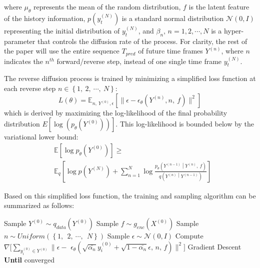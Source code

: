 \documentclass[lettersize,journal]{IEEEtran}
\begin{document}
where $\mu_\theta$ represents the mean of the random distribution, $f$ is the latent feature of the history information, $p\left(y_t^{\left(N\right)}\right)$ is a standard normal distribution $\mathcal{N}\left(0,I\right)$ representing the initial distribution of $y_t^{\left(N\right)}$, and $\beta_n,\, n=1,2,\cdots,N$ is a hyper-parameter that controls the diffusion rate of the process. For clarity, the rest of the paper will use the entire sequence $T_{pred}$ of future time frames $Y^{\left(n\right)}$, where $n$ indicates the $n^{th}$ forward/reverse step, instead of one single time frame $y_t^{\left(N\right)}$.

The reverse diffusion process is trained by minimizing a simplified loss function at each reverse step $n\in\left\{1,\ 2,\ \cdots,\ N\right\}$:
\begin{equation}
    L\left(\theta\right)=\mathbb{E}_{n,\ Y^{\left(0\right)},\epsilon}\left[ \| \epsilon - \epsilon_{\theta}(Y^{\left(n\right)},n,\ f) \|^2 \right]
\end{equation}
which is derived by maximizing the log-likelihood of the final probability distribution $E\left[\log{\left(p_\theta\left(Y^{\left(0\right)}\right)\right)}\right]$. This log-likelihood is bounded below by the variational lower bound:
\begin{equation}
\begin{aligned}
    &\mathbb{E}\left[\log{p_\theta\left(Y^{\left(0\right)}\right)}\right]\geq \\ &\mathbb{E}_q\left[\log p\left(Y^{\left(N\right)}\right)+\sum_{n=1}^{N}\log{\frac{p_\theta\left(Y^{\left(n-1\right)}\middle| Y^{\left(n\right)},\ f\right)}{q\left(Y^{\left(n\right)}\middle| Y^{\left(n-1\right)}\right)}}\right]
\end{aligned}
\end{equation}

Based on this simplified loss function, the training and sampling algorithm can be summarized as follows:
\begin{algorithm}[H]
\caption{Training}\label{alg:alg1}
\begin{algorithmic}
\STATE 
{}
\STATE \hspace{0.5cm}Sample $ Y^{\left(0\right)}\sim q_{data}\left(Y^{\left(0\right)}\right) $
\STATE \hspace{0.5cm}Sample $ f\sim g_{enc}\left(X^{\left(0\right)}\right) $
\STATE \hspace{0.5cm}Sample $ n\sim Uniform\left(\left\{1,\ \ 2,\ \cdots,\ \ N\right\}\right) $
\STATE \hspace{0.5cm}Sample $ \epsilon\sim\mathcal{N}\left(0,I\right) $
\STATE \hspace{0.5cm}Compute $ \nabla [ \sum_{y_i^{\left(0\right)}\in Y^{\left(0\right)}} \| \epsilon- $
\STATE \hspace{3cm}$\epsilon_\theta\left(\sqrt{\bar{\alpha_n}}y_i^{\left(0\right)}+\sqrt{1-\bar{\alpha_n}}\epsilon,\, n,\, f\right) \|^2 ] $
\STATE \hspace{0.5cm} Gradient Descent
\STATE \textbf{Until} converged
\end{algorithmic}
\label{alg1}
\end{algorithm}
\end{document}
